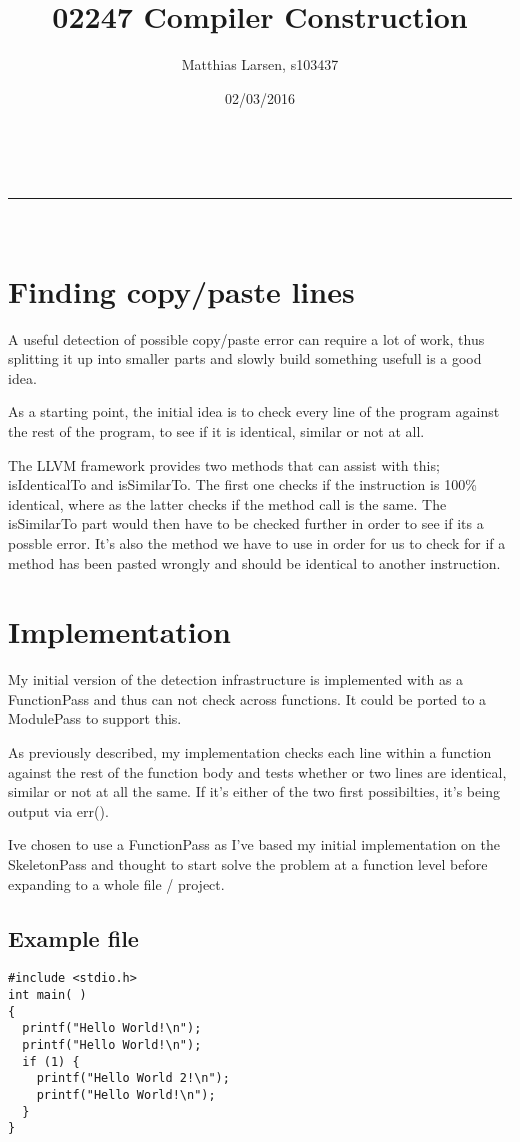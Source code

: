 \documentclass[a4paper,11pt]{article}
\makeatletter
\newcommand{\linia}{\rule{\linewidth}{0.5pt}}
\theoremstyle{mytheor}
\renewcommand{\maketitle}{
\begin{center}
\vspace{2ex}
{\huge \textsc{\@title}}
\vspace{1ex}
\\
\linia\\
\@author \hfill \@date
\vspace{4ex}
\end{center}
}
\makeatother
\begin{document}
\title{02247 Compiler Construction}

\author{Matthias Larsen, s103437}

\date{02/03/2016}

\maketitle

\section*{Finding copy/paste lines}

A useful detection of possible copy/paste error can require a lot of work, thus splitting it up into smaller parts and slowly build something usefull is a good idea.

As a starting point, the initial idea is to check every line of the program against the rest of the program, to see if it is identical, similar or not at all.

The LLVM framework provides two methods that can assist with this; isIdenticalTo and isSimilarTo. The first one checks if the instruction is 100\% identical, where as the latter checks if the method call is the same. The isSimilarTo part would then have to be checked further in order to see if its a possble error.
It's also the method we have to use in order for us to check for if a method has been pasted wrongly and should be identical to another instruction.

\section*{Implementation}

My initial version of the detection infrastructure is implemented with as a FunctionPass and thus can not check across functions.
It could be ported to a ModulePass to support this.

As previously described, my implementation checks each line within a function against the rest of the function body and tests whether or two lines are identical, similar or not at all the same. If it's either of the two first possibilties, it's being output via err().

Ive chosen to use a FunctionPass as I've based my initial implementation on the SkeletonPass and thought to start solve the problem at a function level before expanding to a whole file / project.

\subsection*{Example file}
\begin{verbatim}
#include <stdio.h>
int main( )
{
  printf("Hello World!\n");
  printf("Hello World!\n");
  if (1) {
    printf("Hello World 2!\n");
    printf("Hello World!\n");
  }
}
\end{verbatim}
\end{document}
